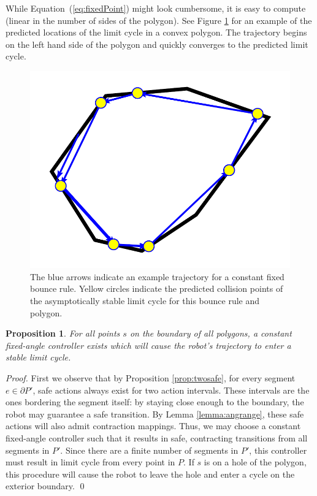 \documentclass[sageh,times,Review]{sagej}
\newtheorem{proposition}{Proposition}
\begin{document}
While Equation~(\ref{eq:fixedPoint}) might look cumbersome, it is easy to compute (linear in the number of sides of the polygon). See Figure \ref{fig:fp} for an example of the predicted locations of the limit cycle in a convex polygon. The trajectory begins on the left hand side of the polygon and quickly converges to the predicted limit cycle.

\begin{figure}
\centering
\includegraphics[width=0.8\columnwidth]{fixed_points_prediction.pdf}
\caption{The blue arrows indicate an example
trajectory for a constant fixed bounce rule. Yellow circles indicate the 
predicted collision points of the
asymptotically stable limit cycle for this bounce rule and polygon.}
\label{fig:fp}
\end{figure}


\begin{proposition} \label{prop:cycle}
For all points $s$ on the boundary of all polygons, a constant
fixed-angle controller exists which will cause the robot's trajectory to enter a
stable limit cycle.
\end{proposition}

\begin{proof}
First we observe that by Proposition \ref{prop:twosafe}, for every segment $e
\in \partial P'$, 
safe actions always exist
for two action intervals. These intervals are the ones bordering the segment itself:
by staying close enough to the boundary, the robot may guarantee a safe
transition. By Lemma \ref{lemma:angrange}, these safe actions will also
admit contraction mappings. Thus, we may choose a constant fixed-angle
controller such that it results in safe, contracting transitions from all
segments in $P'$. Since there are a finite number of segments in $P'$, this
controller must result in limit cycle from every point in $P$. If $s$ is on a
hole of the polygon, this procedure will cause the robot to leave the hole and
enter a cycle on the exterior boundary. \qed
\end{proof}
\end{document}
